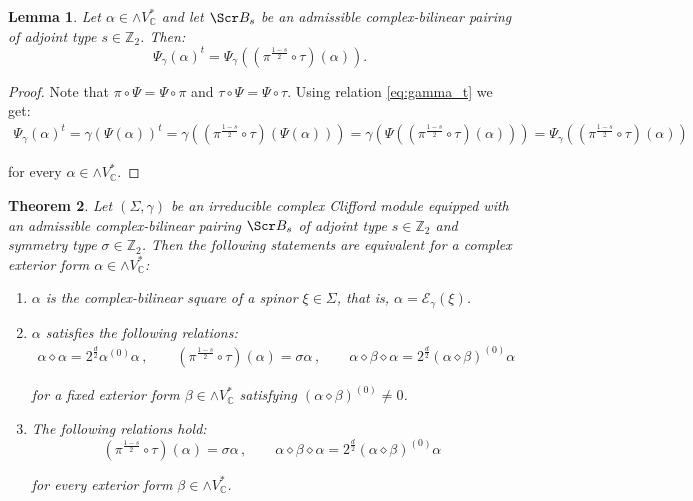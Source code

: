 \documentclass[10pt,a4paper,twoside,reqno]{amsart}
\theoremstyle{plain}
\newtheorem{thm}{Theorem}[section]
\newtheorem{lemma}[thm]{Lemma}
\theoremstyle{definition}
\theoremstyle{remark}
\def\Z{\mathbb{Z}}
\def\C{\mathbb{C}}
\def\scB{\Scr B}
\def\cE{\mathcal{E}}
\begin{document}
\begin{lemma}
\label{lemma:exterior_form_t}
Let $\alpha\in\wedge V^*_\C$ and let $\scB_s$ be an admissible complex-bilinear pairing of adjoint type $s\in\Z_2$. Then:
\begin{equation*}
\Psi_\gamma(\alpha)^t=\Psi_\gamma((\pi^{\frac{1-s}{2}}\circ\tau)(\alpha)).
\end{equation*}
\end{lemma}

\begin{proof}
Note that $\pi\circ\Psi=\Psi\circ\pi$ and $\tau\circ\Psi=\Psi\circ\tau$. Using relation \eqref{eq:gamma_t} we get: 
\begin{eqnarray*}
\Psi_\gamma(\alpha)^t = \gamma(\Psi(\alpha))^t = \gamma((\pi^{\frac{1-s}{2}}\circ\tau)(\Psi(\alpha)))=\gamma(\Psi((\pi^{\frac{1-s}{2}}\circ\tau)(\alpha)))=\Psi_\gamma((\pi^{\frac{1-s}{2}}\circ\tau)(\alpha))   
\end{eqnarray*}

\noindent
for every $\alpha\in\wedge V^*_\C$.
\end{proof}

\begin{thm}
\label{thm:bilinearsquare}
Let $(\Sigma,\gamma)$ be an irreducible complex Clifford module equipped with an admissible complex-bilinear pairing $\scB_s$ of adjoint type $s\in \mathbb{Z}_2$ and symmetry type $\sigma\in \mathbb{Z}_2$. Then the following statements are equivalent for a complex exterior form $\alpha\in\wedge V^*_\C$: 
\begin{enumerate}
\item[\normalfont(a)] $\alpha$ is the complex-bilinear square of a spinor $\xi\in\Sigma$, that is, $\alpha=\cE_\gamma(\xi)$.
\item[\normalfont(b)] $\alpha$ satisfies the following relations: 
\begin{eqnarray*}
\alpha\diamond\alpha = 2^{\frac{d}{2}} \alpha^{(0)}\alpha\,, \qquad (\pi^{\frac{1-s}{2}}\circ\tau) (\alpha) = \sigma \alpha\, , \qquad \alpha \diamond \beta \diamond \alpha = 2^{\frac{d}{2}}(\alpha\diamond\beta)^{(0)}\alpha
\end{eqnarray*}

\noindent
for a fixed exterior form $\beta\in\wedge V^*_\C$ satisfying $(\alpha\diamond\beta)^{(0)} \neq 0$.
\item[\normalfont(c)] The following relations hold: 
\begin{equation*}
(\pi^{\frac{1-s}{2}}\circ\tau)(\alpha)=\sigma\alpha\,, \qquad \alpha \diamond \beta \diamond \alpha = 2^{\frac{d}{2}}(\alpha\diamond\beta)^{(0)}\alpha
\end{equation*}

\noindent
for every exterior form $\beta\in\wedge V^*_\C$.
\end{enumerate}
\end{thm}
\end{document}
